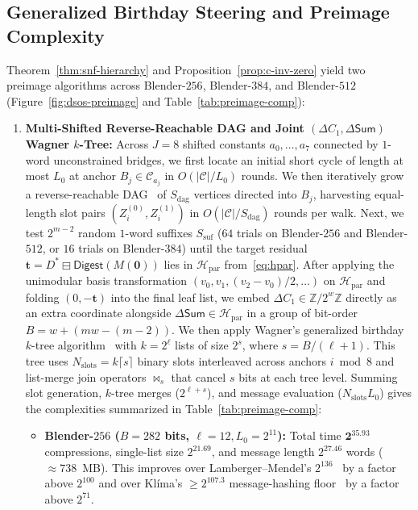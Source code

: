 \documentclass[11pt,a4paper]{article}
\theoremstyle{definition}
\theoremstyle{remark}
\newcommand{\Zmod}[1]{\mathbb{Z}/2^{#1}\mathbb{Z}}
\newcommand{\SumAcc}{\mathsf{Sum}}
\newcommand{\Hpar}{\mathcal{H}_{\mathrm{par}}}
\begin{document}
\subsection{Generalized Birthday Steering and Preimage Complexity}
\label{subsec:wagner-preimage}
Theorem~\ref{thm:snf-hierarchy} and Proposition~\ref{prop:c-inv-zero} yield two preimage algorithms across Blender-$256$, Blender-$384$, and Blender-$512$ (Figure~\ref{fig:dsos-preimage} and Table~\ref{tab:preimage-comp}):

\begin{enumerate}[leftmargin=2em]
    \item \textbf{Multi-Shifted Reverse-Reachable DAG and Joint $(\Delta C_1, \Delta\SumAcc)$ Wagner $k$-Tree:} Across $J = 8$ shifted constants $a_0, \dots, a_7$ connected by $1$-word unconstrained bridges, we first locate an initial short cycle of length at most $L_0$ at anchor $B_j \in \mathcal{C}_{a_j}$ in $O(|\mathcal{C}|/L_0)$ rounds. We then iteratively grow a reverse-reachable DAG~\cite{KK06} of $S_{\mathrm{dag}}$ vertices directed into $B_j$, harvesting equal-length slot pairs $(Z_i^{(0)}, Z_i^{(1)})$ in $O(|\mathcal{C}|/S_{\mathrm{dag}})$ rounds per walk. Next, we test $2^{m-2}$ random $1$-word suffixes $S_{\mathrm{suf}}$ ($64$ trials on Blender-$256$ and Blender-$512$, or $16$ trials on Blender-$384$) until the target residual $\mathbf{t} = D^* \boxminus \mathsf{Digest}(M(\mathbf{0}))$ lies in $\Hpar$ from~\eqref{eq:hpar}. After applying the unimodular basis transformation $(v_0, v_1, (v_2 - v_0)/2, \dots)$ on $\Hpar$ and folding $(0, -\mathbf{t})$ into the final leaf list, we embed $\Delta C_1 \in \Zmod{w}$ directly as an extra coordinate alongside $\Delta\SumAcc \in \Hpar$ in a group of bit-order $B = w + (mw - (m - 2))$. We then apply Wagner's generalized birthday $k$-tree algorithm~\cite{Wag02} with $k = 2^\ell$ lists of size $2^s$, where $s = B / (\ell + 1)$. This tree uses $N_{\mathrm{slots}} = k \lceil s \rceil$ binary slots interleaved across anchors $i \bmod 8$ and list-merge join operators $\bowtie_s$ that cancel $s$ bits at each tree level. Summing slot generation, $k$-tree merges ($2^{\ell + s}$), and message evaluation ($N_{\mathrm{slots}} L_0$) gives the complexities summarized in Table~\ref{tab:preimage-comp}:
    \begin{itemize}[leftmargin=1.5em]
        \item \textbf{Blender-$256$ ($B = 282$ bits, $\ell = 12, L_0 = 2^{11}$):} Total time $\mathbf{2^{35.93}}$ compressions, single-list size $2^{21.69}$, and message length $2^{27.46}$ words ($\approx 738$~MB). This improves over Lamberger--Mendel's $2^{136}$~\cite{LM09} by a factor above $2^{100}$ and over Kl\'{i}ma's $\ge 2^{107.3}$ message-hashing floor~\cite{Kli09} by a factor above $2^{71}$.

\end{itemize}
\end{enumerate}
\end{document}
